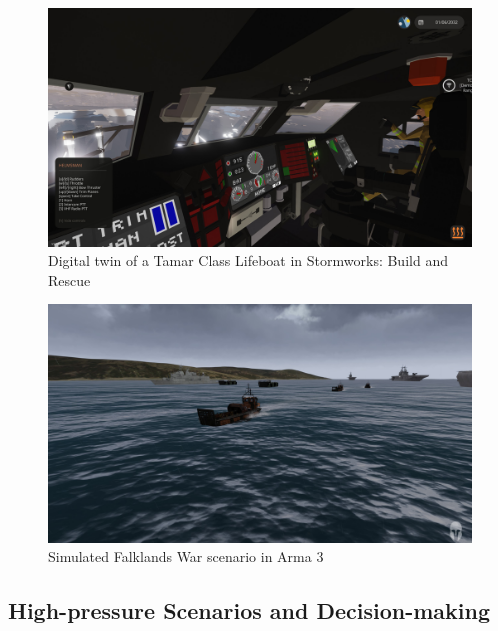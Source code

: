 \documentclass[12pt]{article}
\begin{document}
\begin{figure}[h]
  \centering
  \begin{minipage}[b]{0.9\linewidth}
    \includegraphics[width=\linewidth]{images/tamar-class-lifeboat-stormworks.jpg}
    \caption{Digital twin of a Tamar Class Lifeboat in Stormworks: Build and Rescue}
    \label{fig:tamarclassstormworks}
  \end{minipage}
\end{figure}

\begin{figure}[h]
  \centering
  \begin{minipage}[b]{0.9\linewidth}
    \includegraphics[width=\linewidth]{images/falklands-arma.jpg}
    \caption{Simulated Falklands War scenario in Arma 3}
    \label{fig:falklandsarma}
  \end{minipage}
\end{figure}

\subsection{High-pressure Scenarios and Decision-making}
\end{document}
